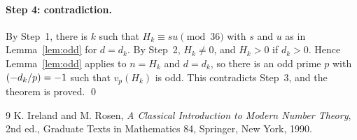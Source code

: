 \documentclass[11pt]{article}
\newcommand{\leg}[2]{\mathchoice{\biggl(\dfrac{#1}{#2}\biggr)}{(#1/#2)}{(#1/#2)}{(#1/#2)}}
\begin{document}
\enlargethispage{5\baselineskip}
\paragraph{Step 4: contradiction.} By Step~1, there is $k$ such that $H_k\equiv su\pmod{36}$ with $s$ and $u$ as in Lemma~\ref{lem:odd} for $d=d_k$. By Step~2, $H_k\neq0$, and $H_k>0$ if $d_k>0$. Hence Lemma~\ref{lem:odd} applies to $n=H_k$ and $d=d_k$, so there is an odd prime $p$ with $\leg{-d_k}{p}=-1$ such that $v_p(H_k)$ is odd. This contradicts Step~3, and the theorem is proved.
\qed

\begin{thebibliography}{9}
 K. Ireland and M. Rosen, \emph{A Classical Introduction to Modern Number Theory}, 2nd ed., Graduate Texts in Mathematics 84, Springer, New York, 1990.
\end{thebibliography}
\end{document}
